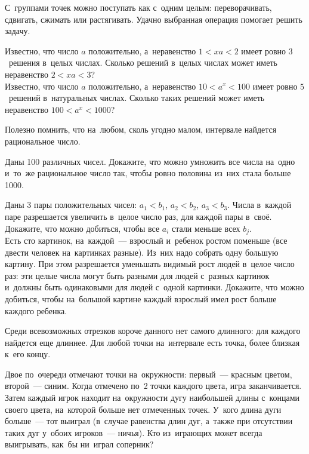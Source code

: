 С~группами точек можно поступать как с~одним целым: переворачивать, сдвигать,
сжимать или растягивать.
Удачно выбранная операция помогает решить задачу.

\begin{exercises}

\item
\subproblem
Известно, что число $a$ положительно, а~неравенство $1 < x a < 2$
имеет ровно $3$~решения в~целых числах.
Сколько решений в~целых числах может иметь неравенство $2 < x a < 3$?
\\
\subproblem
Известно, что число $a$ положительно, а~неравенство $10 < a^{x} < 100$
имеет ровно $5$~решений в~натуральных числах.
Сколько таких решений может иметь неравенство $100 < a^{x} < 1000$?

\end{exercises}

Полезно помнить, что на~любом, сколь угодно малом, интервале найдется
рациональное число.

\begin{exercises}

\item
Даны 100 различных чисел.
Докажите, что можно умножить все числа на~одно и~то~же рациональное число так,
чтобы ровно половина из~них стала больше 1000.

\item
\subproblem
Даны $3$ пары положительных чисел:
$a_{1} < b_{1}$, $a_{2} < b_{2}$, $a_{3} < b_{3}$.
Числа в~каждой паре разрешается увеличить в~целое число раз, для каждой пары
в~своё.
Докажите, что можно добиться, чтобы все $a_{i}$ стали меньше всех $b_{j}$.
\\
\subproblem
Есть сто картинок, на~каждой~--- взрослый и~ребенок ростом поменьше
(все двести человек на~картинках разные).
Из~них надо собрать одну большую картину.
При этом разрешается уменьшать видимый рост людей в~целое число раз: эти целые
числа могут быть разными для людей с~разных картинок и~должны быть одинаковыми
для людей с~одной картинки.
Докажите, что можно добиться, чтобы на~большой картине каждый взрослый имел
рост больше каждого ребенка.

\end{exercises}

Среди всевозможных отрезков короче данного нет самого длинного: для каждого
найдется еще длиннее.
Для любой точки на~интервале есть точка, более близкая к~его концу.

\begin{exercises}

\item{}
Двое по~очереди отмечают точки на~окружности: первый~--- красным цветом,
второй~--- синим.
Когда отмечено по~2 точки каждого цвета, игра заканчивается.
Затем каждый игрок находит на~окружности дугу наибольшей длины с~концами своего
цвета, на~которой больше нет отмеченных точек.
У~кого длина дуги больше~--- тот выиграл (в~случае равенства длин дуг, а~также
при отсутствии таких дуг у~обоих игроков~--- ничья).
Кто из~играющих может всегда выигрывать, как~бы ни~играл соперник?

\end{exercises}

